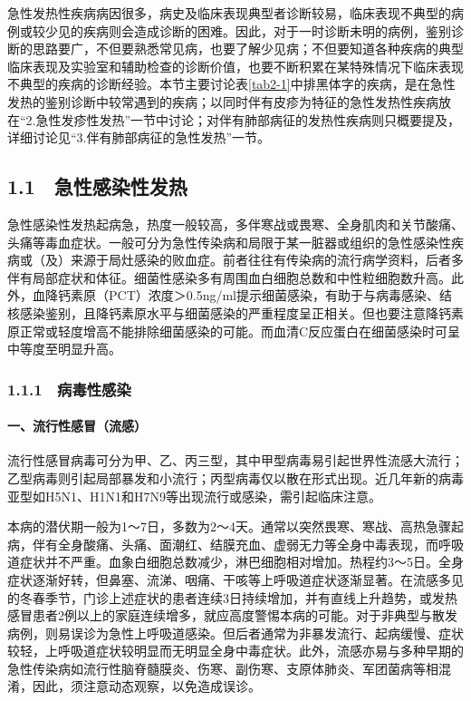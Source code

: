 急性发热性疾病病因很多，病史及临床表现典型者诊断较易，临床表现不典型的病例或较少见的疾病则会造成诊断的困难。因此，对于一时诊断未明的病例，鉴别诊断的思路要广，不但要熟悉常见病，也要了解少见病；不但要知道各种疾病的典型临床表现及实验室和辅助检查的诊断价值，也要不断积累在某特殊情况下临床表现不典型的疾病的诊断经验。本节主要讨论表\ref{tab2-1}中排黑体字的疾病，是在急性发热的鉴别诊断中较常遇到的疾病；以同时伴有皮疹为特征的急性发热性疾病放在“2.急性发疹性发热”一节中讨论；对伴有肺部病征的发热性疾病则只概要提及，详细讨论见“3.伴有肺部病征的急性发热”一节。

\protect\hypertarget{text00013.html}{}{}

\subsection{1.1　急性感染性发热}

急性感染性发热起病急，热度一般较高，多伴寒战或畏寒、全身肌肉和关节酸痛、头痛等毒血症状。一般可分为急性传染病和局限于某一脏器或组织的急性感染性疾病或（及）来源于局灶感染的败血症。前者往往有传染病的流行病学资料，后者多伴有局部症状和体征。细菌性感染多有周围血白细胞总数和中性粒细胞数升高。此外，血降钙素原（PCT）浓度＞0.5ng/ml提示细菌感染，有助于与病毒感染、结核感染鉴别，且降钙素原水平与细菌感染的严重程度呈正相关。但也要注意降钙素原正常或轻度增高不能排除细菌感染的可能。而血清C反应蛋白在细菌感染时可呈中等度至明显升高。

\subsubsection{1.1.1　病毒性感染}

\paragraph{一、流行性感冒（流感）}

流行性感冒病毒可分为甲、乙、丙三型，其中甲型病毒易引起世界性流感大流行；乙型病毒则引起局部暴发和小流行；丙型病毒仅以散在形式出现。近几年新的病毒亚型如H5N1、H1N1和H7N9等出现流行或感染，需引起临床注意。

本病的潜伏期一般为1～7日，多数为2～4天。通常以突然畏寒、寒战、高热急骤起病，伴有全身酸痛、头痛、面潮红、结膜充血、虚弱无力等全身中毒表现，而呼吸道症状并不严重。血象白细胞总数减少，淋巴细胞相对增加。热程约3～5日。全身症状逐渐好转，但鼻塞、流涕、咽痛、干咳等上呼吸道症状逐渐显著。在流感多见的冬春季节，门诊上述症状的患者连续3日持续增加，并有直线上升趋势，或发热感冒患者2例以上的家庭连续增多，就应高度警惕本病的可能。对于非典型与散发病例，则易误诊为急性上呼吸道感染。但后者通常为非暴发流行、起病缓慢、症状较轻，上呼吸道症状较明显而无明显全身中毒症状。此外，流感亦易与多种早期的急性传染病如流行性脑脊髓膜炎、伤寒、副伤寒、支原体肺炎、军团菌病等相混淆，因此，须注意动态观察，以免造成误诊。

